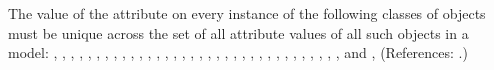 The value of the attribute  on every instance of the following
classes of objects must be unique across the set of all 
attribute values of 
{all such objects in a model:
{
\AlgebraicRule,
\AssignmentRule,
\Compartment,
\Constraint,
\Delay,
\Event,
\EventAssignment,
\FunctionDefinition,
\InitialAssignment,
\KineticLaw,
\ListOfCompartments,
\ListOfConstraints,
\ListOfEventAssignments,
\ListOfEvents,
\ListOfFunctionDefinitions,
\ListOfInitialAssignments,
\ListOfLocalParameters,
\ListOfModifierSpeciesReferences,
\ListOfParameters,
\ListOfReactions,
\ListOfRules,
\ListOfSpecies,
\ListOfSpeciesReferences,
\ListOfUnitDefinitions,
\ListOfUnits,
\Model,
\ModifierSpeciesReference,
\Parameter,
\Priority,
\RateRule,
\Reaction,
\Species,
\SpeciesReference,
\Trigger, and
\Unit
}}, 
(References: .)
